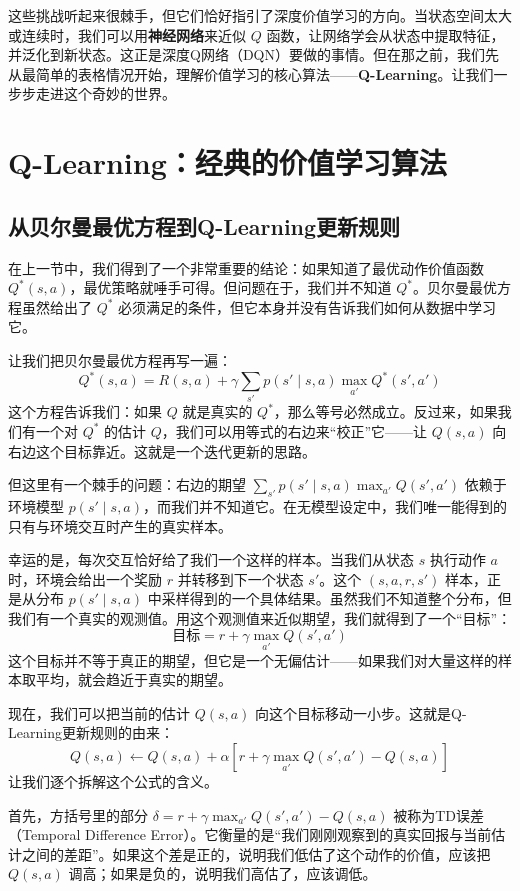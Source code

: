 \documentclass[lang=cn,zihao=-4,a4paper,fontset=windows]{beautybook}
\begin{document}
这些挑战听起来很棘手，但它们恰好指引了深度价值学习的方向。当状态空间太大或连续时，我们可以用\textbf{神经网络}来近似 \(Q\) 函数，让网络学会从状态中提取特征，并泛化到新状态。这正是深度Q网络（DQN）要做的事情。但在那之前，我们先从最简单的表格情况开始，理解价值学习的核心算法——\textbf{Q-Learning}。让我们一步步走进这个奇妙的世界。

\section{Q-Learning：经典的价值学习算法}

\subsection{从贝尔曼最优方程到Q-Learning更新规则}

在上一节中，我们得到了一个非常重要的结论：如果知道了最优动作价值函数 \(Q^*(s,a)\)，最优策略就唾手可得。但问题在于，我们并不知道 \(Q^*\)。贝尔曼最优方程虽然给出了 \(Q^*\) 必须满足的条件，但它本身并没有告诉我们如何从数据中学习它。

让我们把贝尔曼最优方程再写一遍：
\[
Q^*(s,a) = R(s,a) + \gamma \sum_{s'} p(s' \mid s,a) \max_{a'} Q^*(s',a')
\]
这个方程告诉我们：如果 \(Q\) 就是真实的 \(Q^*\)，那么等号必然成立。反过来，如果我们有一个对 \(Q^*\) 的估计 \(Q\)，我们可以用等式的右边来“校正”它——让 \(Q(s,a)\) 向右边这个目标靠近。这就是一个迭代更新的思路。

但这里有一个棘手的问题：右边的期望 \(\sum_{s'} p(s' \mid s,a) \max_{a'} Q(s',a')\) 依赖于环境模型 \(p(s' \mid s,a)\)，而我们并不知道它。在无模型设定中，我们唯一能得到的只有与环境交互时产生的真实样本。

幸运的是，每次交互恰好给了我们一个这样的样本。当我们从状态 \(s\) 执行动作 \(a\) 时，环境会给出一个奖励 \(r\) 并转移到下一个状态 \(s'\)。这个 \((s,a,r,s')\) 样本，正是从分布 \(p(s' \mid s,a)\) 中采样得到的一个具体结果。虽然我们不知道整个分布，但我们有一个真实的观测值。用这个观测值来近似期望，我们就得到了一个“目标”：
\[
\text{目标} = r + \gamma \max_{a'} Q(s', a')
\]
这个目标并不等于真正的期望，但它是一个无偏估计——如果我们对大量这样的样本取平均，就会趋近于真实的期望。

现在，我们可以把当前的估计 \(Q(s,a)\) 向这个目标移动一小步。这就是Q-Learning更新规则的由来：
\[
\boxed{Q(s,a) \leftarrow Q(s,a) + \alpha \left[ r + \gamma \max_{a'} Q(s', a') - Q(s,a) \right]}
\]
让我们逐个拆解这个公式的含义。

首先，方括号里的部分 \(\delta = r + \gamma \max_{a'} Q(s',a') - Q(s,a)\) 被称为TD误差（Temporal Difference Error）。它衡量的是“我们刚刚观察到的真实回报与当前估计之间的差距”。如果这个差是正的，说明我们低估了这个动作的价值，应该把 \(Q(s,a)\) 调高；如果是负的，说明我们高估了，应该调低。
\end{document}
